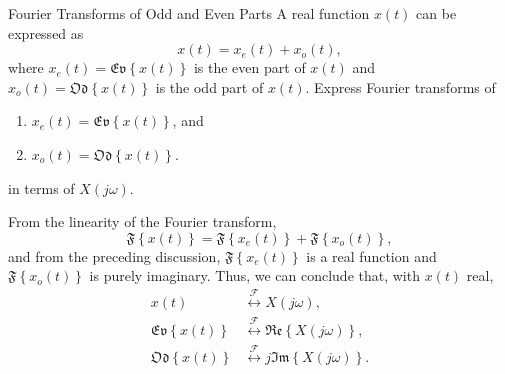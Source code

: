 \begin{frame}{Fourier Transforms of Odd and Even Parts}
    A real function $x(t)$ can be expressed as
    \begin{equation*}
        x(t) = x_e(t) + x_o(t),
    \end{equation*}
    where $x_e(t) = \mathfrak{Ev}\left\{x(t)\right\}$ is the even part of $x(t)$ and $x_o(t) = \mathfrak{Od}\left\{x(t)\right\}$ is the odd part of $x(t)$. Express Fourier transforms of
    \begin{enumerate}
      \item $x_e(t) = \mathfrak{Ev}\left\{x(t)\right\}$, and
      \item $x_o(t) = \mathfrak{Od}\left\{x(t)\right\}$.
    \end{enumerate}
    in terms of $X(j\omega)$.
\end{frame}

\begin{frame}
    {
        From the linearity of the Fourier transform,
        \begin{equation*}
            \mathfrak{F}\left\{x(t)\right\} = \mathfrak{F}\left\{x_e(t)\right\} +\mathfrak{F}\left\{x_o(t)\right\},
        \end{equation*}
        and from the preceding discussion, $\mathfrak{F}\left\{x_e(t)\right\}$ is a real function and $\mathfrak{F}\left\{x_o(t)\right\}$ is purely imaginary. Thus, we can conclude that, with $x(t)$ real,
        \pause
        \begin{align*}
            x(t) &\overset{\mathcal{F}}{\longleftrightarrow} X(j\omega),\\
            \mathfrak{Ev}\left\{x(t)\right\} &\overset{\mathcal{F}}{\longleftrightarrow} \mathfrak{Re}\left\{X(j\omega)\right\},\\
            \mathfrak{Od}\left\{x(t)\right\} &\overset{\mathcal{F}}{\longleftrightarrow} j\mathfrak{Im}\left\{X(j\omega)\right\}.
        \end{align*}
    }
\end{frame}


